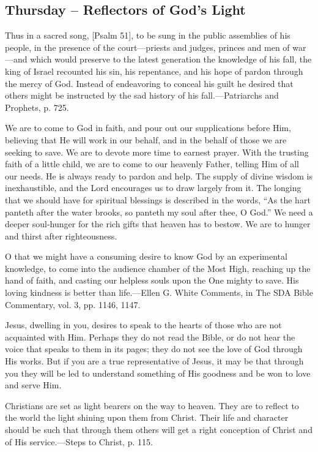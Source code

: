\documentclass[a4paper, 10pt, twoside, headings=small]{scrartcl}
\begin{document}
\begin{multicols}{2}
\section*{Thursday – Reflectors of God’s Light}

Thus in a sacred song, [Psalm 51], to be sung in the public assemblies of his people, in the presence of the court—priests and judges, princes and men of war—and which would preserve to the latest generation the knowledge of his fall, the king of Israel recounted his sin, his repentance, and his hope of pardon through the mercy of God. Instead of endeavoring to conceal his guilt he desired that others might be instructed by the sad history of his fall.—Patriarchs and Prophets, p. 725.

We are to come to God in faith, and pour out our supplications before Him, believing that He will work in our behalf, and in the behalf of those we are seeking to save. We are to devote more time to earnest prayer. With the trusting faith of a little child, we are to come to our heavenly Father, telling Him of all our needs. He is always ready to pardon and help. The supply of divine wisdom is inexhaustible, and the Lord encourages us to draw largely from it. The longing that we should have for spiritual blessings is described in the words, “As the hart panteth after the water brooks, so panteth my soul after thee, O God.” We need a deeper soul-hunger for the rich gifts that heaven has to bestow. We are to hunger and thirst after righteousness.

O that we might have a consuming desire to know God by an experimental knowledge, to come into the audience chamber of the Most High, reaching up the hand of faith, and casting our helpless souls upon the One mighty to save. His loving kindness is better than life.—Ellen G. White Comments, in The SDA Bible Commentary, vol. 3, pp. 1146, 1147.

Jesus, dwelling in you, desires to speak to the hearts of those who are not acquainted with Him. Perhaps they do not read the Bible, or do not hear the voice that speaks to them in its pages; they do not see the love of God through His works. But if you are a true representative of Jesus, it may be that through you they will be led to understand something of His goodness and be won to love and serve Him.

Christians are set as light bearers on the way to heaven. They are to reflect to the world the light shining upon them from Christ. Their life and character should be such that through them others will get a right conception of Christ and of His service.—Steps to Christ, p. 115.


\end{multicols}
\end{document}
